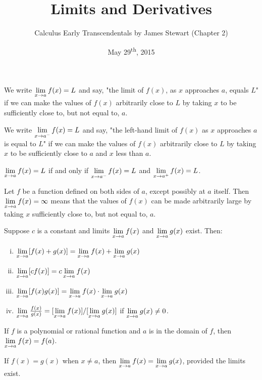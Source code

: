 \documentclass[a4paper,8pt]{article}
\title{Limits and Derivatives}
\author{Calculus Early Transcendentals by James Stewart (Chapter 2)}
\date{May 29\textsuperscript{th}, 2015}
\begin{document}
\maketitle
{}

\begin{outline}

    We write \(\xlimit{x}{a} f(x)=L\) and say, "the limit of \(f(x)\), as \(x\) approaches
    \(a\), equals \(L\)" if we can make the values of \(f(x)\) arbitrarily close to \(L\) by taking \(x\)
    to be sufficiently close to, but not equal to, \(a\).

    We write \(\xlimit[-]{x}{a} f(x)=L\) and say, "the left-hand limit of \(f(x)\) as \(x\)
    approaches \(a\) is equal to \(L\)" if we can make the values of \(f(x)\) arbitrarily close to \(L\) by
    taking \(x\) to be sufficiently close to \(a\) and \(x\) less than \(a\).

    \(\xlimit{x}{a} f(x) = L\) if and only if \(\xlimit[-]{x}{a} f(x) = L\)
    and \(\xlimit[+]{x}{a} f(x) = L\).

    Let \(f\) be a function defined on both sides of \(a\), except possibly at \(a\) itself. Then
    \(\xlimit{x}{a} f(x) = \infty\) means that the values of \(f(x)\) can be made arbitrarily large
    by taking \(x\) sufficiently close to, but not equal to, \(a\).

    Suppose \(c\) is a constant and limits \(\xlimit{x}{a} f(x)\) and \(\xlimit{x}{a} g(x)\) exist. Then:
    \begin{enumerate}[i.]
      \item
        \(\xlimit{x}{a} [f(x) + g(x)] = \xlimit{x}{a} f(x) + \xlimit{x}{a} g(x)\)
      \item
        \(\xlimit{x}{a} [cf(x)] = c \xlimit{x}{a} f(x)\)
      \item
        \(\xlimit{x}{a} [f(x)g(x)] = \xlimit{x}{a} f(x) \cdot \xlimit{x}{a} g(x)\)
      \item
        \(\xlimit{x}{a} \frac{f(x)}{g(x)} = [\xlimit{x}{a}f(x)]/[\xlimit{x}{a}g(x)]\) if
        \(\xlimit{x}{a}g(x) \neq 0\).
    \end{enumerate}

    If \(f\) is a polynomial or rational function and \(a\) is in the domain of \(f\), then
    \(\xlimit{x}{a} f(x) = f(a)\).

    If \(f(x) = g(x)\) when \(x \neq a\), then \(\xlimit{x}{a}f(x) = \xlimit{x}{a}g(x)\), provided the
    limits exist.


\end{outline}
\end{document}
